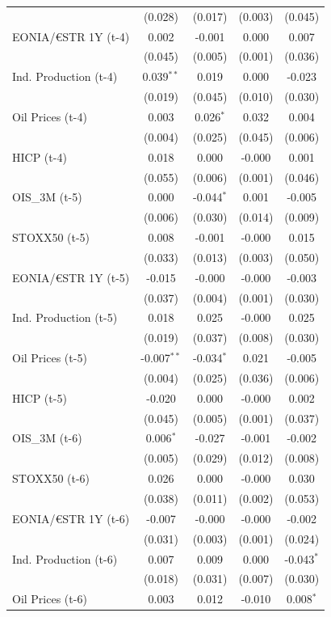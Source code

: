 \begin{longtable}[t]{lcccc}
 & (0.028) & (0.017) & (0.003) & (0.045)\\
EONIA/€STR 1Y (t-4) & 0.002 & -0.001 & 0.000 & 0.007\\
 & (0.045) & (0.005) & (0.001) & (0.036)\\
Ind. Production (t-4) & 0.039$^{**}$ & 0.019 & 0.000 & -0.023\\
 & (0.019) & (0.045) & (0.010) & (0.030)\\
Oil Prices (t-4) & 0.003 & 0.026$^{*}$ & 0.032 & 0.004\\
 & (0.004) & (0.025) & (0.045) & (0.006)\\
HICP (t-4) & 0.018 & 0.000 & -0.000 & 0.001\\
 & (0.055) & (0.006) & (0.001) & (0.046)\\
OIS\_3M (t-5) & 0.000 & -0.044$^{*}$ & 0.001 & -0.005\\
 & (0.006) & (0.030) & (0.014) & (0.009)\\
STOXX50 (t-5) & 0.008 & -0.001 & -0.000 & 0.015\\
 & (0.033) & (0.013) & (0.003) & (0.050)\\
EONIA/€STR 1Y (t-5) & -0.015 & -0.000 & -0.000 & -0.003\\
 & (0.037) & (0.004) & (0.001) & (0.030)\\
Ind. Production (t-5) & 0.018 & 0.025 & -0.000 & 0.025\\
 & (0.019) & (0.037) & (0.008) & (0.030)\\
Oil Prices (t-5) & -0.007$^{**}$ & -0.034$^{*}$ & 0.021 & -0.005\\
 & (0.004) & (0.025) & (0.036) & (0.006)\\
HICP (t-5) & -0.020 & 0.000 & -0.000 & 0.002\\
 & (0.045) & (0.005) & (0.001) & (0.037)\\
OIS\_3M (t-6) & 0.006$^{*}$ & -0.027 & -0.001 & -0.002\\
 & (0.005) & (0.029) & (0.012) & (0.008)\\
STOXX50 (t-6) & 0.026 & 0.000 & -0.000 & 0.030\\
 & (0.038) & (0.011) & (0.002) & (0.053)\\
EONIA/€STR 1Y (t-6) & -0.007 & -0.000 & -0.000 & -0.002\\
 & (0.031) & (0.003) & (0.001) & (0.024)\\
Ind. Production (t-6) & 0.007 & 0.009 & 0.000 & -0.043$^{*}$\\
 & (0.018) & (0.031) & (0.007) & (0.030)\\
Oil Prices (t-6) & 0.003 & 0.012 & -0.010 & 0.008$^{*}$\\

\end{longtable}
